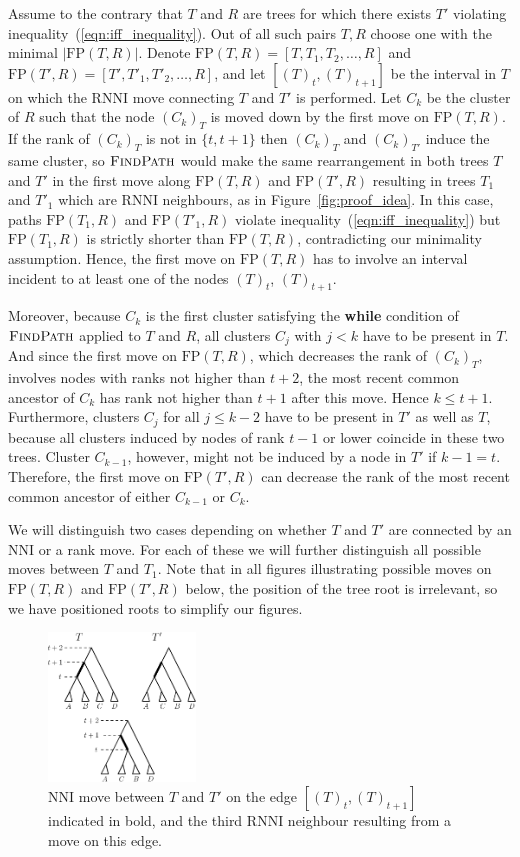 \documentclass[11pt]{amsart}
\newcommand{\rnni}{\mathrm{RNNI}}
\newcommand{\findpath}{\textsc{FindPath}}
\newcommand{\nni}{\mathrm{NNI}}
\newcommand{\fp}{\mathrm{FP}}
\begin{document}
Assume to the contrary that $T$ and $R$ are trees for which there exists $T'$ violating inequality~(\ref{eqn:iff_inequality}).
Out of all such pairs $T, R$ choose one with the minimal $|\fp(T, R)|$.
Denote $\fp(T,R) = [T, T_1, T_2, \ldots, R]$ and $\fp(T', R) = [T', T'_1, T'_2, \ldots, R]$, and let $[(T)_t, (T)_{t+1}]$ be the interval in $T$ on which the $\rnni$ move connecting $T$ and $T'$ is performed.
Let $C_k$ be the cluster of $R$ such that the node $(C_k)_T$ is moved down by the first move on $\fp(T, R)$.
If the rank of $(C_k)_T$ is not in $\{t, t+1\}$ then $(C_k)_T$ and $(C_k)_{T'}$ induce the same cluster, so $\findpath$ would make the same rearrangement in both trees $T$ and $T'$ in the first move along $\fp(T, R)$ and $\fp(T', R)$ resulting in trees $T_1$ and $T'_1$ which are $\rnni$ neighbours, as in Figure~\ref{fig:proof_idea}.
In this case, paths $\fp(T_1, R)$ and $\fp(T'_1, R)$ violate inequality~(\ref{eqn:iff_inequality}) but $\fp(T_1, R)$ is strictly shorter than $\fp(T, R)$, contradicting our minimality assumption.
Hence, the first move on $\fp(T, R)$ has to involve an interval incident to at least one of the nodes $(T)_t$, $(T)_{t+1}$.

Moreover, because $C_k$ is the first cluster satisfying the \textbf{while} condition of $\findpath$ applied to $T$ and $R$, all clusters $C_j$ with $j < k$ have to be present in $T$.
And since the first move on $\fp(T,R)$, which decreases the rank of $(C_k)_T$, involves nodes with ranks not higher than $t+2$, the most recent common ancestor of $C_k$ has rank not higher than $t+1$ after this move.
Hence $k \leq t + 1$.
Furthermore, clusters $C_j$ for all $j \leq k - 2$ have to be present in $T'$ as well as $T$, because all clusters induced by nodes of rank $t - 1$ or lower coincide in these two trees.
Cluster $C_{k-1}$, however, might not be induced by a node in $T'$ if $k-1 = t$.
Therefore, the first move on $\fp(T', R)$ can decrease the rank of the most recent common ancestor of either $C_{k-1}$ or $C_k$.

We will distinguish two cases depending on whether $T$ and $T'$ are connected by an $\nni$ or a rank move.
For each of these we will further distinguish all possible moves between $T$ and $T_1$.
Note that in all figures illustrating possible moves on $\fp(T,R)$ and $\fp(T',R)$ below, the position of the tree root is irrelevant, so we have positioned roots to simplify our figures.

\begin{figure}[ht]
\centering
\includegraphics[width=0.35\textwidth]{thm_fp_nni1}
\caption{$\nni$ move between $T$ and $T'$ on the edge $[(T)_t,(T)_{t+1}]$ indicated in bold, and the third $\rnni$ neighbour resulting from a move on this edge.}
\label{fig:thm_fp_nni1}
\end{figure}
\end{document}
